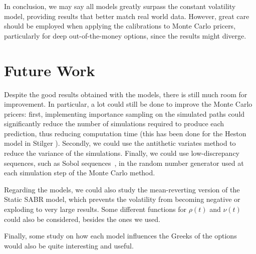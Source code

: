 In conclusion, we may say all models greatly surpass the constant volatility model, providing results that better match real world data. However, great care should be employed when applying the calibrations to Monte Carlo pricers, particularly for deep out-of-the-money options, since the results might diverge.


\section{Future Work}
Despite the good results obtained with the models, there is still much room for improvement. In particular, a lot could still be done to improve the Monte Carlo pricers:  first, implementing importance sampling on the simulated paths could significantly reduce the number of simulations required to produce each prediction, thus reducing computation time (this has been done for the Heston model in Stilger \citep{Stilger}). Secondly, we could use the antithetic variates method to reduce the variance of the simulations. Finally, we could use low-discrepancy sequences, such as Sobol sequences~\citep{Sobol2}, in the random number generator used at each simulation step of the Monte Carlo method.

Regarding the models, we could also study the mean-reverting version of the Static SABR model, which prevents the volatility from becoming negative or exploding to very large results. Some different functions for $\rho(t)$ and $\nu(t)$ could also be considered, besides the ones we used.


Finally, some study on how each model influences the Greeks of the options would also be quite interesting and useful.
